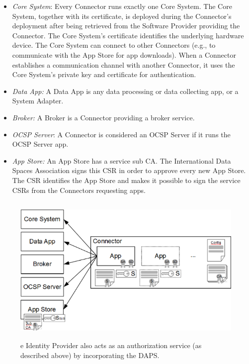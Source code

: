 \begin{itemize}
	\item \textit{Core System}: Every Connector runs exactly one Core System. The Core System, together with its certificate, is deployed during the Connector’s deployment after being retrieved from the Software Provider providing the Connector. The Core System’s certificate identifies the underlying hardware device. The Core System can connect to other Connectors (e.g., to communicate with the App Store for app downloads). When a Connector establishes a communication channel with another Connector, it uses the Core System’s private key and certificate for authentication.

	\item \textit{Data App:} A Data App is any data processing or data collecting app, or a System Adapter.

	\item \textit{Broker:} A Broker is a Connector providing a broker service.

	\item \textit{OCSP Server}: A Connector is considered an OCSP Server if it runs the OCSP Server app.

	\item \textit{App Store:} An App Store has a service sub CA. The International Data Spaces Association signs this CSR in order to approve every new App Store. The CSR identifies the App Store and makes it possible to sign the service CSRs from the Connectors requesting apps.

\end{itemize}




\begin{figure}[H]
	\begin{Center}
		\includegraphics[width=4.98in,height=2.86in]{./media/image63.png}
		\caption{e Identity Provider also acts as an authorization service (as described above) by incorporating the DAPS.}
		\label{fig:e_Identity_Provider_also_acts_as_an_authorization_service_as_described_above_by_incorporating_the_DAPS}
	\end{Center}
\end{figure}


